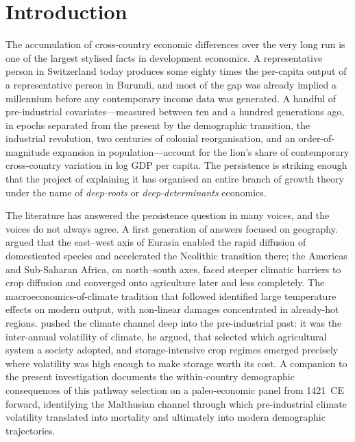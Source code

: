 \documentclass[11pt,letterpaper]{article}
\begin{document}
\begin{abstract}
\medskip
\noindent\textbf{JEL Codes:} O11, O13, O44, N50, Q54.\\
\textbf{Keywords:} Deep determinants, unified growth theory, population density, ancient DNA, functional alleles, Neolithic ancestry, climate volatility, ancestral crop yield, Shapley decomposition.
\end{abstract}

\section{Introduction}
\label{sec:intro}

The accumulation of cross-country economic differences over the very long run is one of the largest stylised facts in development economics. A representative person in Switzerland today produces some eighty times the per-capita output of a representative person in Burundi, and most of the gap was already implied a millennium before any contemporary income data was generated. A handful of pre-industrial covariates---measured between ten and a hundred generations ago, in epochs separated from the present by the demographic transition, the industrial revolution, two centuries of colonial reorganisation, and an order-of-magnitude expansion in population---account for the lion's share of contemporary cross-country variation in log GDP per capita. The persistence is striking enough that the project of explaining it has organised an entire branch of growth theory under the name of \emph{deep-roots} or \emph{deep-determinants} economics.

The literature has answered the persistence question in many voices, and the voices do not always agree. A first generation of answers focused on geography. \citet{diamond1997guns} argued that the east--west axis of Eurasia enabled the rapid diffusion of domesticated species and accelerated the Neolithic transition there; the Americas and Sub-Saharan Africa, on north--south axes, faced steeper climatic barriers to crop diffusion and converged onto agriculture later and less completely. The macroeconomics-of-climate tradition that followed \citep{dell2012temperature, burke2015global, hsiang2017global} identified large temperature effects on modern output, with non-linear damages concentrated in already-hot regions. \citet{matranga2024} pushed the climate channel deep into the pre-industrial past: it was the inter-annual volatility of climate, he argued, that selected which agricultural system a society adopted, and storage-intensive crop regimes emerged precisely where volatility was high enough to make storage worth its cost. A companion to the present investigation \citep{alonso_long_shadow} documents the within-country demographic consequences of this pathway selection on a paleo-economic panel from 1421~CE forward, identifying the Malthusian channel through which pre-industrial climate volatility translated into mortality and ultimately into modern demographic trajectories.
\end{document}
